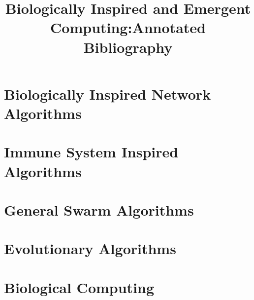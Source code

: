 

\bibliographyunit[\section]

\title{Biologically Inspired and Emergent Computing:Annotated Bibliography} 

\author{
}

\maketitle
\section{Biologically Inspired Network Algorithms}
\nocite{1543949}
\nocite{508968}
\nocite{1322308}
\nocite{1315848}
\nocite{1555287}
\nocite{1555288}
\nocite{1555289}
\putbib
\section{Immune System Inspired Algorithms}
\nocite{00538159}
\nocite{00970460}
\nocite{1018906}
\putbib
\section{General Swarm Algorithms}
\nocite{rouff-2004}
\nocite{1089771}
\putbib
\section{Evolutionary Algorithms}
\nocite{1555286}
\putbib
\section{Biological Computing}
\nocite{1555300}
\putbib
